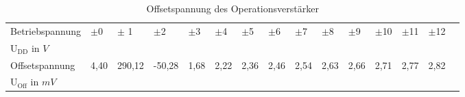 \begin{table}[!ht]
\caption{Offsetspannung des Operationsverst\"arker}
\vspace{0.3cm}
\hspace{-1.2cm}
\begin{tabular}{|l|l|l|l|l|l|l|l|l|l|l|l|l|l|l|}
\hline
Betriebspannung & $\pm$0 & $\pm$ 1& $\pm$2& $\pm$3& $\pm$4& $\pm$5& $\pm$6 & $\pm$7& $\pm$8& $\pm$9& $\pm$10& $\pm$11 & $\pm$12 \\
U$_{\text{DD}}$ in $V$ & &&&&&&&&&&&& \\
\hline
Offsetspannung &4,40 & 290,12 & -50,28 & 1,68 & 2,22 & 2,36 & 2,46 & 2,54 & 2,63 & 2,66 & 2,71 & 2,77 & 2,82\\
U$_{\text{Off}}$ in $mV$ &&&&&&&&&&&&& \\
\hline
\end{tabular}
\end{table}